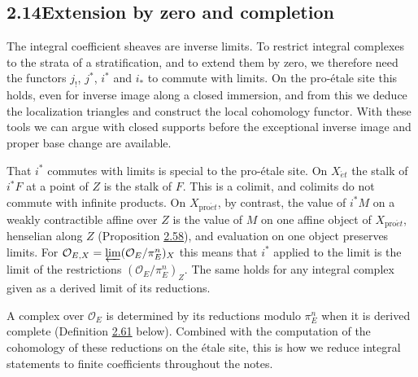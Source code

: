 \documentclass[11pt]{article}
\begin{document}
\subsection*{\texorpdfstring{2.14\quad Extension by zero and completion}{2.14 Extension by zero and completion}}
\label{bp177}%
\label{bp178}%
The integral coefficient sheaves are inverse limits. To restrict integral complexes to the strata of a stratification, and to extend them by zero, we therefore need the functors \(j_!\), \(j^*\), \(i^*\) and \(i_*\) to commute with limits. On the pro-étale site this holds, even for inverse image along a closed immersion, and from this we deduce the localization triangles and construct the local cohomology functor. With these tools we can argue with closed supports before the exceptional inverse image and proper base change are available.

That \(i^*\) commutes with limits is special to the pro-étale site. On \(X_{\acute{e}t}\) the stalk of \(i^*F\) at a point of \(Z\) is the stalk of \(F\). This is a colimit, and colimits do not commute with infinite products. On \(X_{\mathrm{pro}\acute{e}t}\), by contrast, the value of \(i^*M\) on a weakly contractible affine over \(Z\) is the value of \(M\) on one affine object of \(X_{\mathrm{pro}\acute{e}t}\), henselian along \(Z\) (Proposition \hyperref[bp179]{2.58}), and evaluation on one object preserves limits. For \(\mathcal O_{E,X}=\varprojlim(\mathcal O_E/\pi_E^n)_X\) this means that \(i^*\) applied to the limit is the limit of the restrictions \((\mathcal O_E/\pi_E^n)_Z\). The same holds for any integral complex given as a derived limit of its reductions.

A complex over \(\mathcal O_E\) is determined by its reductions modulo \(\pi_E^n\) when it is derived complete (Definition \hyperref[bp186]{2.61} below). Combined with the computation of the cohomology of these reductions on the étale site, this is how we reduce integral statements to finite coefficients throughout the notes.
\end{document}
